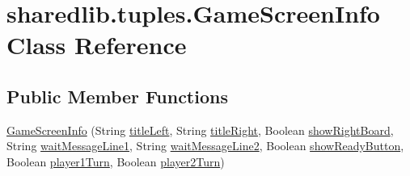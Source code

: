 \hypertarget{classsharedlib_1_1tuples_1_1_game_screen_info}{}\section{sharedlib.\+tuples.\+Game\+Screen\+Info Class Reference}
\label{classsharedlib_1_1tuples_1_1_game_screen_info}
\subsection*{Public Member Functions}
\begin{DoxyCompactItemize}
\item 
\hyperlink{classsharedlib_1_1tuples_1_1_game_screen_info_afb0ad82f66df017e2bf096e26d1fe9bc}{Game\+Screen\+Info} (String \hyperlink{classsharedlib_1_1tuples_1_1_game_screen_info_a392cdcfa4234bd8eb9589cd524d3a356}{title\+Left}, String \hyperlink{classsharedlib_1_1tuples_1_1_game_screen_info_ad7f7ecc83677d2a067d02f746dcd78b9}{title\+Right}, Boolean \hyperlink{classsharedlib_1_1tuples_1_1_game_screen_info_a0f37c050a0cfbf35d993ca4af17df941}{show\+Right\+Board}, String \hyperlink{classsharedlib_1_1tuples_1_1_game_screen_info_aa942419eb30486ee131a58a0077f7e9a}{wait\+Message\+Line1}, String \hyperlink{classsharedlib_1_1tuples_1_1_game_screen_info_ae38bc6bfe2713b88a9b9fd1e1480d9a6}{wait\+Message\+Line2}, Boolean \hyperlink{classsharedlib_1_1tuples_1_1_game_screen_info_a6ad33a0d9b3ccc289366498b863037d7}{show\+Ready\+Button}, Boolean \hyperlink{classsharedlib_1_1tuples_1_1_game_screen_info_a38ed897b3243178155fe43f55c83556c}{player1\+Turn}, Boolean \hyperlink{classsharedlib_1_1tuples_1_1_game_screen_info_ae6af422c349ee6dd17af8d2a585e2d2b}{player2\+Turn})
\end{DoxyCompactItemize}

